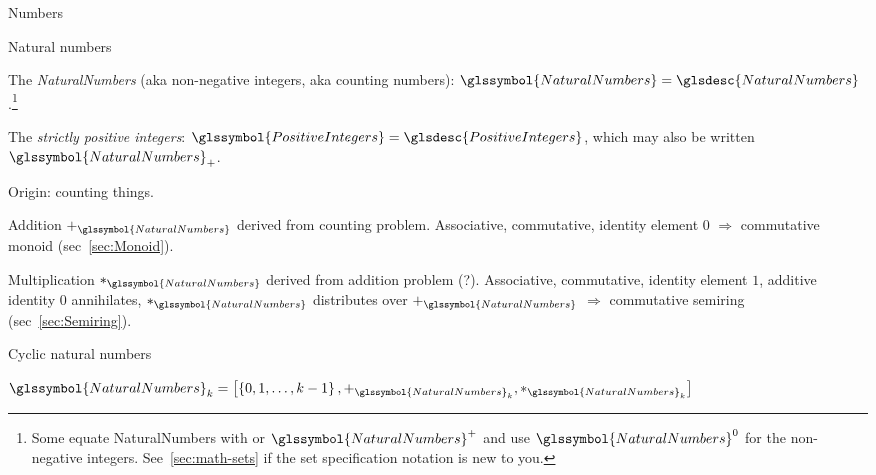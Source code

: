 \begin{plSection}{Numbers}
% 


\lstset{language=Clojure}

\begin{plSection}{Natural numbers}
\label{sec:Natural-numbers}

The \textit{\gls{NaturalNumbers}} 
(aka non-negative integers, aka counting
numbers):\label{NaturalNumbers}
$\glssymbol{NaturalNumbers} = 
\glsdesc{NaturalNumbers}$.\footnote{ 
Some
equate \gls{NaturalNumbers} with  
or $\glssymbol{NaturalNumbers}^{+}$ and use
$\glssymbol{NaturalNumbers}^{0}$ for the non-negative integers. 
See~\cref{sec:math-sets} if the set specification
notation is new to you.}

The \textit{strictly positive integers}: 
$\glssymbol{PositiveIntegers} = \glsdesc{PositiveIntegers}$, which 
may also be written $\glssymbol{NaturalNumbers}_{+}$.

Origin: counting things.

Addition $+_{\glssymbol{NaturalNumbers}}$ 
derived from counting problem.
Associative, commutative, identity element $0$ $\Rightarrow$ 
commutative monoid (sec~\ref{sec:Monoid}).

Multiplication $*_{\glssymbol{NaturalNumbers}}$
derived from addition problem (?).
Associative, commutative, identity element $1$,
additive identity $0$ annihilates,
$*_{\glssymbol{NaturalNumbers}}$ distributes over 
$+_{\glssymbol{NaturalNumbers}}$ 
 $\Rightarrow$
commutative semiring 
(sec~\ref{sec:Semiring}).
\begin{plSection}{Cyclic natural numbers}

${\glssymbol{NaturalNumbers}}_{k} = 
\left[ \left\{ 0, 1, \ldots, k-1 \right\},
+_{\glssymbol{NaturalNumbers}_{k}},
*_{\glssymbol{NaturalNumbers}_{k}} \right]$


\end{plSection}
\end{plSection}
\end{plSection}
